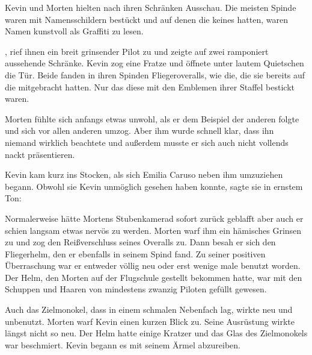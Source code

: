 \par

Kevin und Morten hielten nach ihren Schränken Ausschau. Die meisten Spinde waren mit Namensschildern bestückt und auf denen die keines hatten, waren Namen kunstvoll als Graffiti zu lesen.

\par

, rief ihnen ein breit grinsender Pilot zu und zeigte auf zwei ramponiert aussehende Schränke. Kevin zog eine Fratze und öffnete unter lautem Quietschen die Tür. Beide fanden in ihren Spinden Fliegeroveralls, wie die, die sie bereits auf die  mitgebracht hatten. Nur das diese mit den Emblemen ihrer Staffel bestickt waren.

\par

Morten fühlte sich anfangs etwas unwohl, als er dem Beispiel der anderen folgte und sich vor allen anderen umzog. Aber ihm wurde schnell klar, dass ihn niemand wirklich beachtete und außerdem musste er sich auch nicht vollends nackt präsentieren.

\par

Kevin kam kurz ins Stocken, als sich Emilia Caruso neben ihm umzuziehen begann. Obwohl sie Kevin unmöglich gesehen haben konnte, sagte sie in ernstem Ton: 

\par

Normalerweise hätte Mortens Stubenkamerad sofort zurück geblafft aber auch er schien langsam etwas nervös zu werden. Morten warf ihm ein hämisches Grinsen zu und zog den Reißverschluss seines Overalls zu. Dann besah er sich den Fliegerhelm, den er ebenfalls in seinem Spind fand. Zu seiner positiven Überraschung war er entweder völlig neu oder erst wenige male benutzt worden. Der Helm, den Morten auf der Flugschule gestellt bekommen hatte, war mit den Schuppen und Haaren von mindestens zwanzig Piloten gefüllt gewesen.

\par

Auch das Zielmonokel, dass in einem schmalen Nebenfach lag, wirkte neu und unbenutzt. Morten warf Kevin einen kurzen Blick zu. Seine Ausrüstung wirkte längst nicht so neu. Der Helm hatte einige Kratzer und das Glas des Zielmonokels war beschmiert. Kevin begann es mit seinem Ärmel abzureiben.

